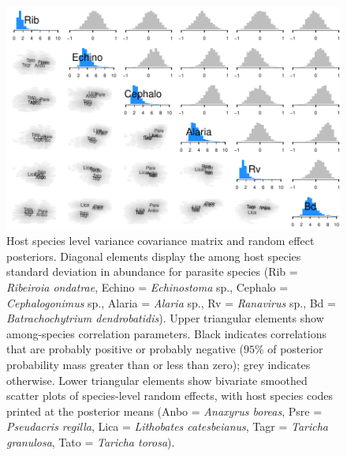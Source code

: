 \begin{figure}[ht]\centering
\includegraphics[width=\linewidth]{figs/ch4/amg_species}
\caption[Host species level variance covariance matrix and random effect posteriors]{Host species level variance covariance matrix and random effect posteriors. Diagonal elements display the among host species standard deviation in abundance for parasite species (Rib = \textit{Ribeiroia ondatrae}, Echino = \textit{Echinostoma} sp., Cephalo = \textit{Cephalogonimus} sp., Alaria = \textit{Alaria} sp., Rv = \textit{Ranavirus} sp., Bd = \textit{Batrachochytrium dendrobatidis}). Upper triangular elements show among-species correlation parameters. Black indicates correlations that are probably positive or probably negative ($95\%$ of posterior probability mass greater than or less than zero); grey indicates otherwise. Lower triangular elements show bivariate smoothed scatter plots of species-level random effects, with host species codes printed at the posterior means (Anbo = \textit{Anaxyrus boreas}, Psre = \textit{Pseudacris regilla}, Lica = \textit{Lithobates catesbeianus}, Tagr = \textit{Taricha granulosa}, Tato = \textit{Taricha torosa}).}
\label{fig:amg_species}
\end{figure}

